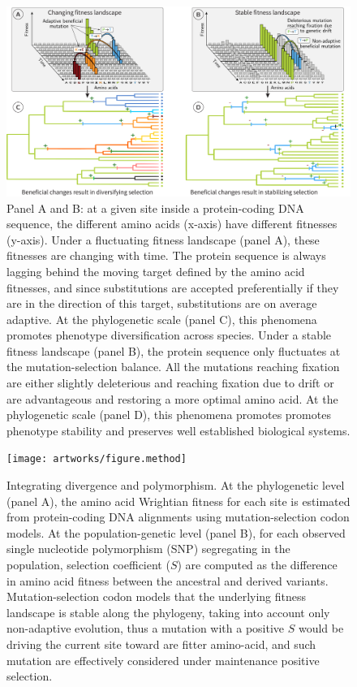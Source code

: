 \documentclass{article}
\newcommand{\Sphy}{S}
\begin{document}
    \begin{figure}[!ht]
        \centering
        \includegraphics[width=\textwidth, page=1] {artworks/figure.fitness-landscape}
        \caption{
            Panel A and B: at a given site inside a protein-coding DNA sequence, the different amino acids (x-axis) have different fitnesses (y-axis).
            Under a fluctuating fitness landscape (panel A), these fitnesses are changing with time.
            The protein sequence is always lagging behind the moving target defined by the amino acid fitnesses, and since substitutions are accepted preferentially if they are in the direction of this target, substitutions are on average adaptive.
            At the phylogenetic scale (panel C), this phenomena promotes phenotype diversification across species.
            Under a stable fitness landscape (panel B), the protein sequence only fluctuates at the mutation-selection balance.
            All the mutations reaching fixation are either slightly deleterious and reaching fixation due to drift or are advantageous and restoring a more optimal amino acid.
            At the phylogenetic scale (panel D), this phenomena promotes promotes phenotype stability and preserves well established biological systems.
        }
        \label{fig:fitness-landscape}
    \end{figure}

    \begin{figure}[!ht]
        \centering
        \texttt{[image: artworks/figure.method]}
        \caption{
            Integrating divergence and polymorphism.
            At the phylogenetic level (panel A), the amino acid Wrightian fitness for each site is estimated from protein-coding DNA alignments using mutation-selection codon models.
            At the population-genetic level (panel B), for each observed single nucleotide polymorphism (SNP) segregating in the population, selection coefficient ($\Sphy$) are computed as the difference in amino acid fitness between the ancestral and derived variants.
            Mutation-selection codon models that the underlying fitness landscape is stable along the phylogeny, taking into account only non-adaptive evolution, thus a mutation with a positive $\Sphy$ would be driving the current site toward are fitter amino-acid, and such mutation are effectively considered under maintenance positive selection.
        }
        \label{fig:method}
    \end{figure}
\end{document}
